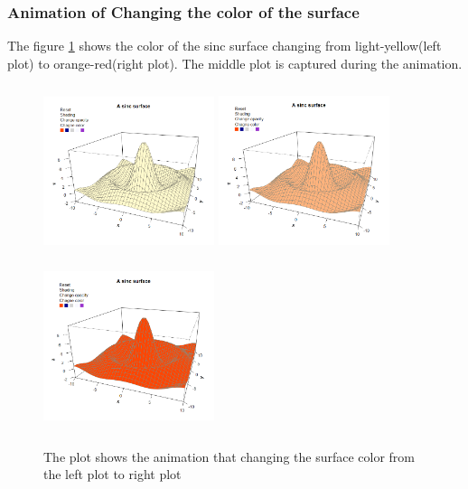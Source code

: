\documentclass[paper=a4, fontsize=11pt]{report}
\begin{document}
\subsubsection*{Animation of Changing the color of the surface}
The figure \ref{Example_6.3.1} shows the color of the sinc surface changing from light-yellow(left plot) to orange-red(right plot). The middle plot is captured during the animation. 
\begin{figure}[h]
\begin{center}
  \includegraphics[height = 5cm, width = 5cm]{figure/svg/origin_1.PNG}
  \includegraphics[height = 5cm, width = 5cm]{figure/svg/change_2.PNG}
  \includegraphics[height = 5cm, width = 5cm]{figure/svg/change_3.PNG}
  \caption{The plot shows the animation that changing the surface color from the left plot to right plot}
  	\label{Example_6.3.1}
\end{center}
\end{figure}
\end{document}
